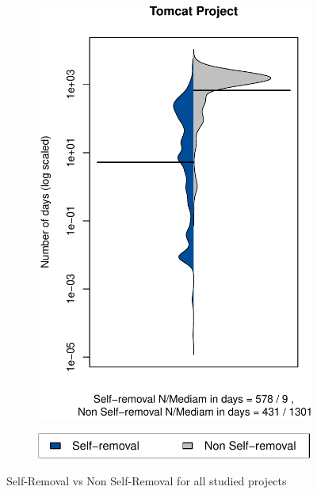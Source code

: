 \begin{figure}[t]
\begin{subfigure}[b]{0.195\textwidth}
		\includegraphics[width=\textwidth]{figures/test/Tomcat.pdf}
		\label{fig:removal_comparison_tomcat} 
	\end{subfigure}
	\begin{subfigure}[b]{0.30\textwidth}
		\includegraphics[width=\textwidth]{figures/test/legend.pdf}
	\end{subfigure}
	\caption{Self-Removal vs Non Self-Removal for all studied projects}
	
\end{figure}



